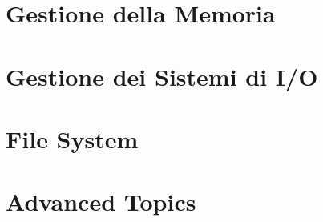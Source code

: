 \documentclass{article}
\begin{document}
\section{Gestione della Memoria}
\pagebreak

\section{Gestione dei Sistemi di I/O}
\pagebreak

\section{File System}
\pagebreak

\section{Advanced Topics}
\end{document}
